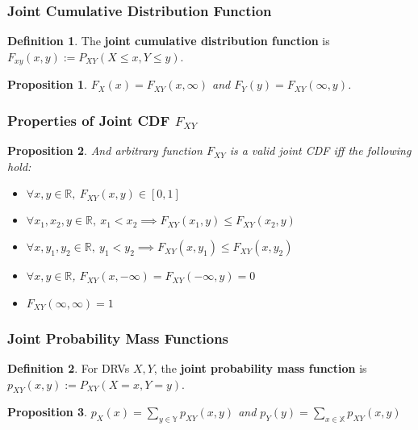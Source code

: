 \documentclass[12pt]{article}
\newtheorem*{prop*}{Proposition}
\theoremstyle{definition}
\newtheorem{defn}{Definition}[subsection]
\newcommand{\R}{\mathbb{R}}
\newcommand{\X}{\mathbb{X}}
\newcommand{\Y}{\mathbb{Y}}
\begin{document}
\subsubsection{Joint Cumulative Distribution Function}

\begin{defn}
  The \textbf{joint cumulative distribution function} is $F_{xy}(x, y) := P_{XY}(X \leq x, Y \leq y)$.
\end{defn}

\begin{prop*}
  $F_X(x) = F_{XY}(x, \infty)$ and $F_Y(y) = F_{XY}(\infty, y)$.
\end{prop*}

\subsubsection{Properties of Joint CDF $F_{XY}$}

\begin{prop*}
  And arbitrary function $F_{XY}$ is a valid joint CDF iff the following hold:
  \begin{itemize}
    \item $\forall x, y \in \R,\ F_{XY}(x, y) \in [0, 1]$
    \item $\forall x_1, x_2, y \in \R,\ x_1 < x_2 \implies F_{XY}(x_1, y) \leq F_{XY}(x_2, y)$
    \item $\forall x, y_1, y_2 \in \R,\ y_1 < y_2 \implies F_{XY}(x, y_1) \leq F_{XY}(x, y_2)$
    \item $\forall x, y \in \R$, $F_{XY}(x, -\infty) = F_{XY}(-\infty, y) = 0$
    \item $F_{XY}(\infty, \infty) = 1$
  \end{itemize}
\end{prop*}

\subsubsection{Joint Probability Mass Functions}

\begin{defn}
  For DRVs $X, Y$, the \textbf{joint probability mass function} is\\ $p_{XY}(x, y) := P_{XY}(X = x, Y = y)$.
\end{defn}

\begin{prop*}
  $p_X(x) = \sum_{y \in \Y}p_{XY}(x, y)$ and $p_Y(y) = \sum_{x \in \X}p_{XY}(x, y)$
\end{prop*}
\end{document}
